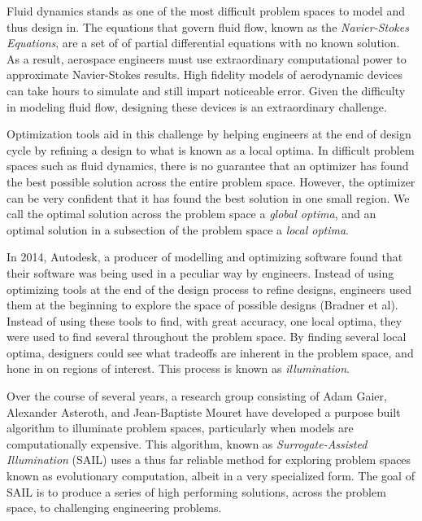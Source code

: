 \documentclass{sig-alternate}
\begin{document}
Fluid dynamics stands as one of the most difficult problem spaces to model and thus design in.
The equations that govern fluid flow, known as the \textit{Navier-Stokes Equations}, are a set of of partial differential equations with no known solution.
As a result, aerospace engineers must use extraordinary computational power to approximate Navier-Stokes results.
High fidelity models of aerodynamic devices can take hours to simulate and still impart noticeable error.
Given the difficulty in modeling fluid flow, designing these devices is an extraordinary challenge.

Optimization tools aid in this challenge by helping engineers at the end of design cycle by refining a design to what is known as a local optima.
In difficult problem spaces such as fluid dynamics, there is no guarantee that an optimizer has found the best possible solution across the entire problem space.
However, the optimizer can be very confident that it has found the best solution in one small region.
We call the optimal solution across the problem space a \textit{global optima}, and an optimal solution in a subsection of the problem space a \textit{local optima}. 

In 2014, Autodesk, a producer of modelling and optimizing software found that their software was being used in a peculiar way by engineers.
Instead of using optimizing tools at the end of the design process to refine designs, engineers used them at the beginning to explore the space of possible designs (Bradner et al).
Instead of using these tools to find, with great accuracy, one local optima, they were used to find several throughout the problem space.
By finding several local optima, designers could see what tradeoffs are inherent in the problem space, and hone in on regions of interest.
This process is known as \textit{illumination}.

Over the course of several years, a research group consisting of Adam Gaier, Alexander Asteroth, and Jean-Baptiste Mouret have developed a purpose built algorithm to illuminate problem spaces, particularly when models are computationally expensive.
This algorithm, known as \textit{Surrogate-Assisted Illumination} (SAIL) uses a thus far reliable method for exploring problem spaces known as evolutionary computation, albeit in a very specialized form.
The goal of SAIL is to produce a series of high performing solutions, across the problem space, to challenging engineering problems.

\end{document}
